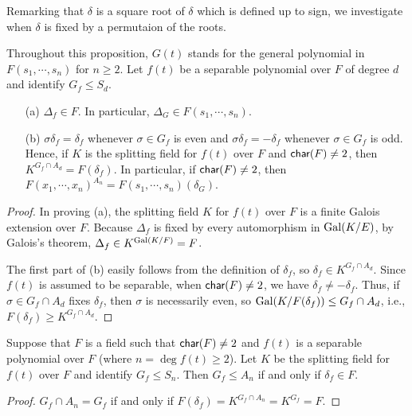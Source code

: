 Remarking that $\delta$ is a square root of $\delta$ which is defined up to sign, we investigate when $\delta$ is fixed by a permutaion of the roots.
\begin{prop}
    Throughout this proposition, $G(t)$ stands for the general polynomial in $F(s_1, \cdots, s_n)$ for $n\geq 2$.
    Let $f(t)$ be a separable polynomial over $F$ of degree $d$ and identify $G_f\leq S_d$.
    \begin{enumerate}
        \item[(a)]
        {
            $\Delta_f\in F$.
            In particular, $\Delta_G\in F(s_1, \cdots, s_n)$.
        }
        \item[(b)]
        {
            $\sigma\delta_f=\delta_f$ whenever $\sigma\in G_f$ is even and $\sigma\delta_f=-\delta_f$ whenever $\sigma\in G_f$ is odd.
            Hence, if $K$ is the splitting field for $f(t)$ over $F$ and \color{teal}${\textsf{char}({F})}\neq 2$\color{black}, then $K^{G_f\cap A_d}=F(\delta_f)$.
            In particular, if ${\textsf{char}({F})}\neq 2$, then $F(x_1, \cdots, x_n)^{A_n}=F(s_1, \cdots, s_n)(\delta_G)$.
        }
    \end{enumerate}
\end{prop}
\begin{proof}
    In proving (a), the splitting field $K$ for $f(t)$ over $F$ is a finite Galois extension over $F$.
    Because $\Delta_f$ is fixed by every automorphism in ${\textrm{Gal}({K/E})}$, by Galois's theorem, $\Delta_f\in K^{\textrm{Gal}({K/F})}=F$.

    The first part of (b) easily follows from the definition of $\delta_f$, so $\delta_f\in K^{G_f\cap A_d}$.
    Since $f(t)$ is assumed to be separable, when ${\textsf{char}({F})}\neq 2$, we have $\delta_f\neq-\delta_f$.
    Thus, if $\sigma\in G_f\cap A_d$ fixes $\delta_f$, then $\sigma$ is necessarily even, so ${\textrm{Gal}({K/F(\delta_f)})}\leq G_f\cap A_d$, i.e., $F(\delta_f)\geq K^{G_f\cap A_d}$.
\end{proof}
\begin{cor}
    Suppose that $F$ is a field such that ${\textsf{char}({F})}\neq 2$ and $f(t)$ is a separable polynomial over $F$ (where $n=\deg f(t)\geq 2$).
    Let $K$ be the splitting field for $f(t)$ over $F$ and identify $G_f\leq S_n$.
    Then $G_f\leq A_n$ if and only if $\delta_f\in F$.
\end{cor}
\begin{proof}
    $G_f\cap A_n=G_f$ if and only if $F(\delta_f)=K^{G_f\cap A_n}=K^{G_f}=F$.
\end{proof}

